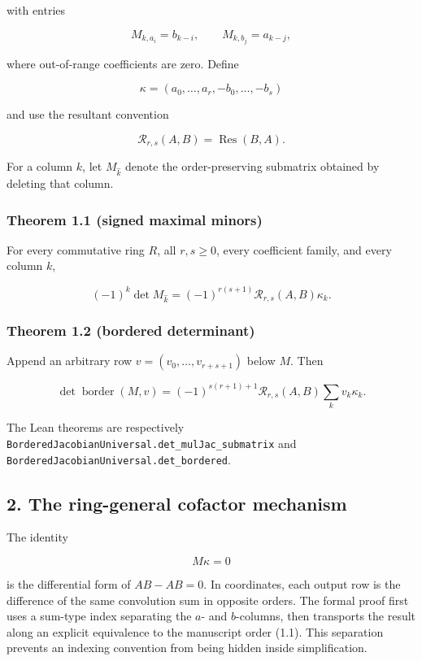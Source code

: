 \documentclass[
  11pt,
  a4paper,
]{article}
\begin{document}
with entries

\[
M_{k,a_i}=b_{k-i},\qquad M_{k,b_j}=a_{k-j},
\tag{1.1}
\]

where out-of-range coefficients are zero. Define

\[
\kappa=(a_0,\ldots,a_r,-b_0,\ldots,-b_s)
\tag{1.2}
\]

and use the resultant convention

\[
\mathcal R_{r,s}(A,B)=\operatorname{Res}(B,A).
\tag{1.3}
\]

For a column \(k\), let \(M_{\widehat k}\) denote the order-preserving
submatrix obtained by deleting that column.

\subsubsection{Theorem 1.1 (signed maximal
minors)}\label{theorem-1.1-signed-maximal-minors}

For every commutative ring \(R\), all \(r,s\ge0\), every coefficient
family, and every column \(k\),

\[
\boxed{
(-1)^k\det M_{\widehat k}
=(-1)^{r(s+1)}\mathcal R_{r,s}(A,B)\kappa_k.}
\tag{1.4}
\]

\subsubsection{Theorem 1.2 (bordered
determinant)}\label{theorem-1.2-bordered-determinant}

Append an arbitrary row \(v=(v_0,\ldots,v_{r+s+1})\) below \(M\). Then

\[
\boxed{
\det\operatorname{border}(M,v)
=(-1)^{s(r+1)+1}\mathcal R_{r,s}(A,B)
\sum_kv_k\kappa_k.}
\tag{1.5}
\]

The Lean theorems are respectively
\texttt{BorderedJacobianUniversal.det\_mulJac\_submatrix} and
\texttt{BorderedJacobianUniversal.det\_bordered}.

\subsection{2. The ring-general cofactor
mechanism}\label{the-ring-general-cofactor-mechanism}

The identity

\[
M\kappa=0
\tag{2.1}
\]

is the differential form of \(AB-AB=0\). In coordinates, each output row
is the difference of the same convolution sum in opposite orders. The
formal proof first uses a sum-type index separating the \(a\)- and
\(b\)-columns, then transports the result along an explicit equivalence
to the manuscript order (1.1). This separation prevents an indexing
convention from being hidden inside simplification.
\end{document}

